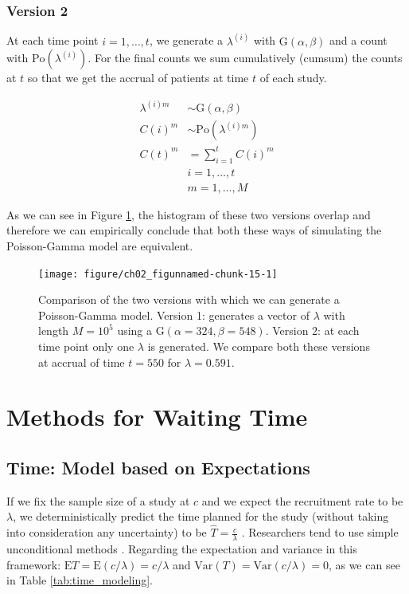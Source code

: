 \subsection{Version 2}

At each time point $i=1,\ldots, t$, we generate a $\lambda^{(i)}$ with $\textrm{G}(\alpha, \beta)$ and a count with $\textrm{Po}(\lambda^{(i)})$. For the final counts we sum cumulatively (cumsum) the counts at $t$ so that we get the accrual of patients at time $t$ of each study.

\begin{align*}
\lambda^{(i)m} &\sim \textrm{G}(\alpha, \beta) \\
C (i)^m&\sim \textrm{Po} (\lambda^{(i)m})\\
C(t)^m &= \sum_{i=1}^tC(i)^m \\
& i = 1, \ldots, t \\
& m = 1, \ldots, M 
\end{align*}


As we can see in Figure \ref{fig:2_12}, the histogram of these two versions overlap and therefore we can empirically conclude that both these ways of simulating the Poisson-Gamma model are equivalent.


\begin{figure}
\begin{knitrout}
\color{fgcolor}

{\centering \texttt{[image: figure/ch02\_figunnamed-chunk-15-1]} 

}


\end{knitrout}
  \caption{Comparison of the two versions with which we can generate a Poisson-Gamma model. Version 1: generates a vector of $\lambda$ with length $M=10^5$ using a $\textrm{G}(\alpha = 324, \beta = 548)$. Version 2: at each time point only one $\lambda$ is generated. We compare both these versions at accrual of time $t=550$ for $\lambda=0.591$.}
  \label{fig:2_12}
\end{figure}

\chapter{Methods for Waiting Time} 
\section{Time: Model based on Expectations}

If we fix the sample size of a study at $c$ and we expect the recruitment rate to be $\lambda$, we deterministically predict the time planned for the study (without taking into consideration any uncertainty) to be $\hat{T}=\frac{c}{\lambda}$ \citep{bagiella2001predicting}. Researchers tend to use simple unconditional methods \citep{white2015projection}. Regarding the expectation and variance in this framework: $\textrm{E}T = \textrm{E}(c/\lambda) = c/\lambda$ and $\textrm{Var}(T) = \textrm{Var}(c/\lambda) = 0$, as we can see in Table \ref{tab:time_modeling}.


